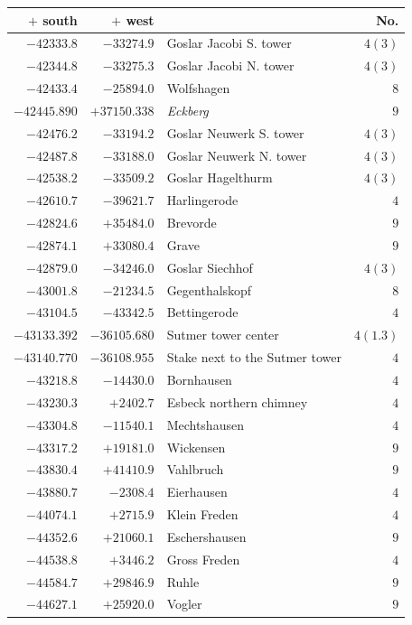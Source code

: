 \clearpage
\begin{center}\begingroup\fontsize{8}{9}\selectfont
\setlength{\tabcolsep}{4pt}
\begin{tabular}{r|r|p{170pt}|r}\hline
\(+\) south&\(+\) west&&No.\\\hline
\(-42333.8\)&\(-33274.9\)&Goslar Jacobi S. tower&\(4 (3)\)\\
\(-42344.8\)&\(-33275.3\)&Goslar Jacobi N. tower&\(4 (3)\)\\
\(-42433.4\)&\(-25894.0\)&Wolfshagen&\(8\)\\
\(-42445.890\)&\(+37150.338\)&\textit{Eckberg}&\(9\)\\
\(-42476.2\)&\(-33194.2\)&Goslar Neuwerk S. tower&\(4 (3)\)\\
\(-42487.8\)&\(-33188.0\)&Goslar Neuwerk N. tower&\(4 (3)\)\\
\(-42538.2\)&\(-33509.2\)&Goslar Hagelthurm&\(4 (3)\)\\
\(-42610.7\)&\(-39621.7\)&Harlingerode&\(4\)\\
\(-42824.6\)&\(+35484.0\)&Brevorde&\(9\)\\
\(-42874.1\)&\(+33080.4\)&Grave&\(9\)\\
\(-42879.0\)&\(-34246.0\)&Goslar Siechhof&\(4 (3)\)\\
\(-43001.8\)&\(-21234.5\)&Gegenthalskopf&\(8\)\\
\(-43104.5\)&\(-43342.5\)&Bettingerode&\(4\)\\
\(-43133.392\)&\(-36105.680\)&Sutmer tower center&\(4(1.3)\)\\
\(-43140.770\)&\(-36108.955\)&Stake next to the Sutmer tower&\(4\)\\
\(-43218.8\)&\(-14430.0\)&Bornhausen&\(4\)\\
\(-43230.3\)&\(+2402.7\)&Esbeck northern chimney&\(4\)\\
\(-43304.8\)&\(-11540.1\)&Mechtshausen&\(4\)\\
\(-43317.2\)&\(+19181.0\)&Wickensen&\(9\)\\
\(-43830.4\)&\(+41410.9\)&Vahlbruch&\(9\)\\
\(-43880.7\)&\(-2308.4\)&Eierhausen&\(4\)\\
\(-44074.1\)&\(+2715.9\)&Klein Freden&\(4\)\\
\(-44352.6\)&\(+21060.1\)&Eschershausen&\(9\)\\
\(-44538.8\)&\(+3446.2\)&Gross Freden&\(4\)\\
\(-44584.7\)&\(+29846.9\)&Ruhle&\(9\)\\
\(-44627.1\)&\(+25920.0\)&Vogler&\(9\)\\

\end{tabular}
\end{center}
